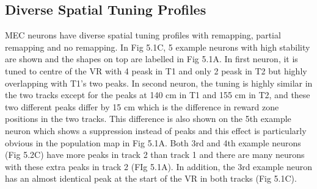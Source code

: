 \subsection{Diverse Spatial Tuning Profiles}
MEC neurons have diverse spatial tuning profiles with remapping, partial remapping and no remapping. In Fig 5.1C, 5 example neurons with high stability are shown and the shapes on top are labelled in Fig 5.1A. In first neuron, it is tuned to centre of the VR with 4 peask in T1 and only 2 peask in T2 but highly overlapping with T1's two peaks. In second neuron, the tuning is highly similar in the two tracks except for the peaks at 140 cm in T1 and 155 cm in T2, and these two different peaks differ by 15 cm which is the difference in reward zone positions in the two tracks. This difference is also shown on the 5th example neuron which shows a suppression instead of peaks and this effect is particularly obvious in the population map in Fig 5.1A. Both 3rd and 4th example neurons (Fig 5.2C) have more peaks in track 2 than track 1 and there are many neurons with these extra peaks in track 2 (FIg 5.1A). In addition, the 3rd example neuron has an almost identical peak at the start of the VR in both tracks (Fig 5.1C).
